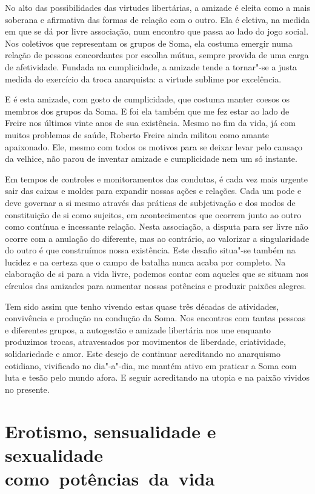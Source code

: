 No alto das possibilidades das virtudes libertárias, a amizade é eleita
como a mais soberana e afirmativa das formas de relação com o outro. Ela
é eletiva, na medida em que se dá por livre associação, num encontro que
passa ao lado do jogo social. Nos coletivos que representam os grupos de
Soma, ela costuma emergir numa relação de pessoas concordantes por
escolha mútua, sempre provida de uma carga de afetividade. Fundada na
cumplicidade, a amizade tende a tornar"-se a justa medida do exercício da
troca anarquista: a virtude sublime por excelência.

E é esta amizade, com gosto de cumplicidade, que costuma manter coesos
os membros dos grupos da Soma. E foi ela também que me fez estar ao lado
de Freire nos últimos vinte anos de sua existência. Mesmo no fim da
vida, já com muitos problemas de saúde, Roberto Freire ainda militou
como amante apaixonado. Ele, mesmo com todos os motivos para se deixar
levar pelo cansaço da velhice, não parou de inventar amizade e
cumplicidade nem um só instante.

Em tempos de controles e monitoramentos das condutas, é cada vez mais
urgente sair das caixas e moldes para expandir nossas ações e relações.
Cada um pode e deve governar a si mesmo através das práticas de
subjetivação e dos modos de constituição de si como sujeitos, em
acontecimentos que ocorrem junto ao outro como contínua e incessante
relação. Nesta associação, a disputa para ser livre não ocorre com a
anulação do diferente, mas ao contrário, ao valorizar a singularidade do
outro é que construímos nossa existência. Este desafio situa"-se também
na lucidez e na certeza que o campo de batalha nunca acaba por completo.
Na elaboração de si para a vida livre, podemos contar com aqueles que se
situam nos círculos das amizades para aumentar nossas potências e
produzir paixões alegres.

Tem sido assim que tenho vivendo estas quase três décadas de atividades,
convivência e produção na condução da Soma. Nos encontros com tantas
pessoas e diferentes grupos, a autogestão e amizade libertária nos une
enquanto produzimos trocas, atravessados por movimentos de liberdade,
criatividade, solidariedade e amor. Este desejo de continuar acreditando
no anarquismo cotidiano, vivificado no dia"-a"-dia, me mantém ativo em
praticar a Soma com luta e tesão pelo mundo afora. E seguir acreditando
na utopia e na paixão vividos no presente.

\section{Erotismo, sensualidade e sexualidade como~potências~da~vida}

